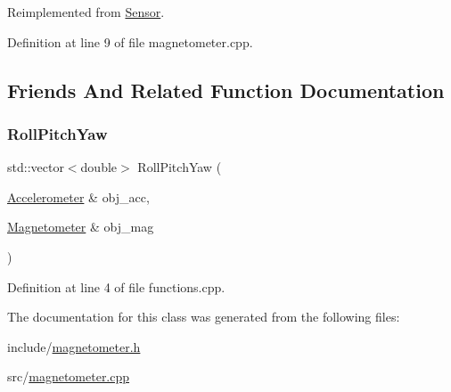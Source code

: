 Reimplemented from \hyperlink{class_sensor_a6f16371eb71419f49ea1363ca81d0755}{Sensor}.



Definition at line 9 of file magnetometer.\+cpp.



\subsection{Friends And Related Function Documentation}
\mbox{\label{classsensor_1_1_magnetometer_af6581f59b9f71cabfa36a46d177deb5f}} 
\subsubsection{\texorpdfstring{Roll\+Pitch\+Yaw}{RollPitchYaw}}
{\footnotesize\ttfamily std\+::vector$<$double$>$ Roll\+Pitch\+Yaw (\begin{DoxyParamCaption}\item[{\hyperlink{classsensor_1_1_accelerometer}{Accelerometer} \&}]{obj\+\_\+acc,  }\item[{\hyperlink{classsensor_1_1_magnetometer}{Magnetometer} \&}]{obj\+\_\+mag }\end{DoxyParamCaption})\hspace{0.3cm}{\ttfamily [friend]}}



Definition at line 4 of file functions.\+cpp.



The documentation for this class was generated from the following files\+:\begin{DoxyCompactItemize}
\item 
include/\hyperlink{magnetometer_8h}{magnetometer.\+h}\item 
src/\hyperlink{magnetometer_8cpp}{magnetometer.\+cpp}\end{DoxyCompactItemize}
